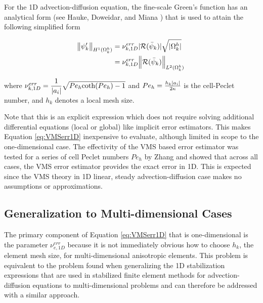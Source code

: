 For the 1D advection-diffusion equation, the fine-scale Green's function has an analytical form (see Hauke, Doweidar, and Miana \cite{hauke2006proper}) that is used to attain the following simplified form

\begin{align}
      \norm{\psi_k'}_{H^1(\Omega^h_k)} &= \nu^{err}_{k,1D} |\mathcal{R}(\bar{\psi}_k)| \sqrt{|\Omega^h_k|} \\
            &= \nu^{err}_{k,1D} \norm{\mathcal{R}(\bar{\psi}_k)}_{L^2(\Omega^h_k)}
      \label{eq:VMSerr1D}
\end{align}

\noindent where $\nu^{err}_{k,1D} = \dfrac{1}{|a_i|} \sqrt{Pe_h \text{coth}({Pe_h})-1}$ and $Pe_h = \frac{h_k |a_i|}{2\kappa}$ is the cell-Peclet number, and $h_k$ denotes a local mesh size.

Note that this is an explicit expression which does not require solving additional differential equations (local or global) like implicit error estimators.
This makes Equation \ref{eq:VMSerr1D} inexpensive to evaluate, although limited in scope to the one-dimensional case. The effectivity of the VMS based error estimator was tested for a series of cell Peclet numbers $Pe_h$ by Zhang \cite{zhang19} and showed that across all cases, the VMS error estimator provides the exact error in 1D. 
This is expected since the VMS theory in 1D linear, steady advection-diffusion case makes no assumptions or approximations.

\subsection{Generalization to Multi-dimensional Cases}

The primary component of Equation \ref{eq:VMSerr1D} that is one-dimensional is the parameter $\nu^{err}_{e,1D}$ because it is not immediately obvious how to choose $h_k$, the element mesh size, for multi-dimensional anisotropic elements.
This problem is equivalent to the problem found when generalizing the 1D stabilization expressions that are used in stabilized finite element methods for advection-diffusion equations to multi-dimensional problems \cite{hughes1986newiii} and can therefore be addressed with a similar approach.


